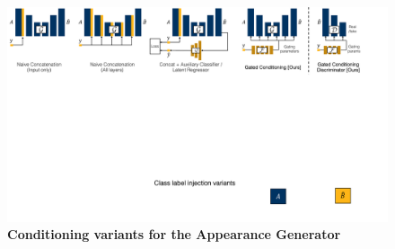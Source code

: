 \begin{figure}[t]
    \centering
    \includegraphics[width=1.\linewidth]{paper_images/arch_inject2.pdf}
    \caption{
    \vspace{-2mm}
    {\bf Conditioning variants for the Appearance Generator} \label{fig:arch-gate}
    \vspace{-2mm}
    }
\end{figure}

